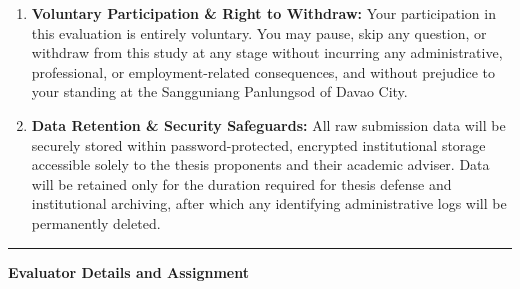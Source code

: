 \begin{enumerate}[leftmargin=1.8em, itemsep=4pt]
    \item \textbf{Voluntary Participation \& Right to Withdraw:} Your participation in this evaluation is entirely voluntary. You may pause, skip any question, or withdraw from this study at any stage without incurring any administrative, professional, or employment-related consequences, and without prejudice to your standing at the Sangguniang Panlungsod of Davao City.
    \item \textbf{Data Retention \& Security Safeguards:} All raw submission data will be securely stored within password-protected, encrypted institutional storage accessible solely to the thesis proponents and their academic adviser. Data will be retained only for the duration required for thesis defense and institutional archiving, after which any identifying administrative logs will be permanently deleted.
\end{enumerate}

\vspace{0.5em}
\noindent{}

\vspace{1em}
\hrule
\vspace{1em}

\noindent\textbf{Evaluator Details and Assignment}

